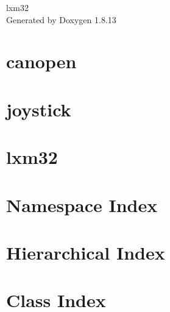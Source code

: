 \documentclass[twoside]{book}
\newcommand{\+}{\discretionary{\mbox{\scriptsize$\hookleftarrow$}}{}{}}
\newcommand{\clearemptydoublepage}{%
  \newpage{\pagestyle{empty}\cleardoublepage}%
}
\begin{document}
\hypersetup{pageanchor=false,
             bookmarksnumbered=true,
             pdfencoding=unicode
            }
\begin{titlepage}
\vspace*{7cm}
\begin{center}%
{\Large lxm32 }\\
\vspace*{1cm}
{\large Generated by Doxygen 1.8.13}\\
\end{center}
\end{titlepage}
\clearemptydoublepage
{}
\tableofcontents
\clearemptydoublepage
{}
\hypersetup{pageanchor=true}

\chapter{canopen}
\label{md__home_adev__documents__s_t_e_c_h_lxm32_lib_canopen__r_e_a_d_m_e}

\chapter{joystick}
\label{md__home_adev__documents__s_t_e_c_h_lxm32_lib_joystick__r_e_a_d_m_e}

\chapter{lxm32}
\label{md__home_adev__documents__s_t_e_c_h_lxm32__r_e_a_d_m_e}

\chapter{Namespace Index}

\chapter{Hierarchical Index}

\chapter{Class Index}

\end{document}
